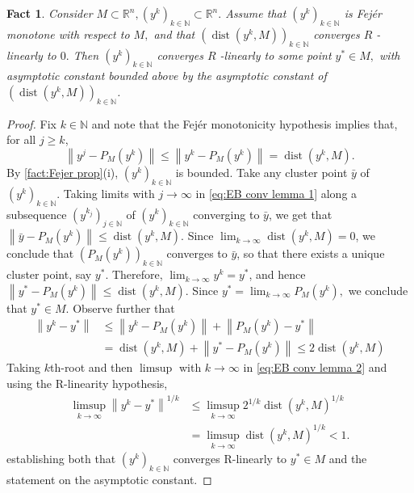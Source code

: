 \documentclass[smallextended,numbook,nospthms]{svjour3}
\theoremstyle{plain}
\newtheorem{fact}[theorem]{Fact}
\theoremstyle{definition}
\def\RR{\mathds R}
\def\NN{\mathds N}
\DeclareMathOperator{\dist}{dist}
\begin{document}
\begin{fact}\label{fact:lemma EB conv}
	Consider $M \subset \RR^{n},\left(y^{k}\right)_{k \in \NN} \subset \RR^{n} .$ Assume that $\left(y^{k}\right)_{k \in \NN}$ is Fejér monotone with respect to $M,$ and that $\left(\operatorname{dist}\left(y^{k}, M\right)\right)_{k \in \NN}$ converges $R$ -linearly to $0 .$ Then $\left(y^{k}\right)_{k \in \NN}$ converges $R$ -linearly to some point $y^{*} \in M,$ with asymptotic constant bounded above by the asymptotic constant of $\left(\operatorname{dist}\left(y^{k}, M\right)\right)_{k \in \NN}$.
\end{fact}
\begin{proof}
	Fix $k \in \NN$ and note that the Fejér monotonicity hypothesis implies that, for all $j \geq k$,
	\[
	\left\|y^{j}-P_{M}\left(y^{k}\right)\right\| \leq\left\|y^{k}-P_{M}\left(y^{k}\right)\right\|=\operatorname{dist}\left(y^{k}, M\right). \label{eq:EB conv lemma 1}
	\]
	By \cref{fact:Fejer prop}(i), $\left(y^{k}\right)_{k \in \NN}$ is bounded. Take any cluster point $\bar{y}$ of $\left(y^{k}\right)_{k \in \NN}$. Taking limits with $j \rightarrow \infty$ in \cref{eq:EB conv lemma 1} along a subsequence $\left(y^{k_{j}}\right)_{j \in \NN}$ of $\left(y^{k}\right)_{k \in \NN}$ converging to $\bar{y}$, we get that $\left\|\bar{y}-P_{M}\left(y^{k}\right)\right\| \leq \dist\left(y^{k}, M\right)$. Since $\lim _{k \rightarrow \infty} \dist\left(y^{k}, M\right)=0$, we conclude that $\left(P_{M}\left(y^{k}\right)\right)_{k \in \NN}$ converges to $\bar{y}$, so that
	there exists a unique cluster point, say $y^{*}$. Therefore, $\lim _{k \rightarrow \infty} y^{k}=y^{*}$, and hence $\left\|y^{*}-P_{M}\left(y^{k}\right)\right\| \leq \dist\left(y^{k}, M\right)$. Since $y^{*}=\lim _{k \rightarrow \infty} P_{M}\left(y^{k}\right),$ we conclude that $y^{*} \in M$. Observe further that
	\begin{align}
		\left\|y^{k}-y^{*}\right\|
		&\leq \left\|y^{k}-P_{M}\left(y^{k}\right)\right\|+\left\|P_{M}\left(y^{k}\right)-y^{*}\right\| \\
		&=\operatorname{dist}\left(y^{k}, M\right)+\left\|y^{*}-P_{M}\left(y^{k}\right)\right\| \leq 2 \dist\left(y^{k}, M\right) \label{eq:EB conv lemma 2}
	\end{align}
	Taking $k$th-root and then $\limsup$ with $k \rightarrow \infty$ in \cref{eq:EB conv lemma 2} and using the R-linearity hypothesis,
	\begin{align}
		\limsup _{k \rightarrow \infty}\left\|y^{k}-y^{*}\right\|^{1 / k} & \leq \limsup _{k \rightarrow \infty} 2^{1/k} \dist\left(y^{k}, M\right)^{1/k} \\
		&=\limsup _{k \rightarrow \infty} \dist\left(y^{k}, M\right)^{1/k}<1.
	\end{align}
	establishing both that $\left(y^{k}\right)_{k \in \NN}$ converges R-linearly to $y^{*} \in M$ and the statement on the asymptotic constant.
\end{proof}
\end{document}
